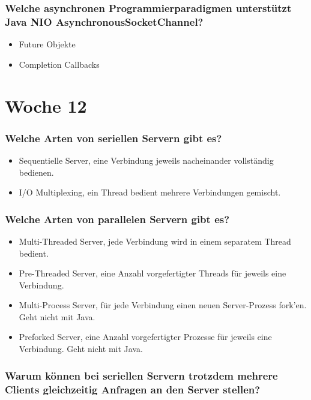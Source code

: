 \documentclass[10pt,a4paper]{scrartcl}
\begin{document}
\subsubsection{Welche asynchronen Programmierparadigmen unterstützt Java NIO AsynchronousSocketChannel?}

\begin{itemize}
	\item Future Objekte
	\item Completion Callbacks
\end{itemize}


\section{Woche 12}

\subsubsection{Welche Arten von seriellen Servern gibt es?}

\begin{itemize}
	\item Sequentielle Server, eine Verbindung jeweils nacheinander vollständig bedienen.
	\item I/O Multiplexing, ein Thread bedient mehrere Verbindungen gemischt.
\end{itemize}

\subsubsection{Welche Arten von parallelen Servern gibt es?}

\begin{itemize}
	\item Multi-Threaded Server, jede Verbindung wird in einem separatem Thread bedient.
	\item Pre-Threaded Server, eine Anzahl vorgefertigter Threads für jeweils eine Verbindung.
	\item Multi-Process Server, für jede Verbindung einen neuen Server-Prozess fork'en. Geht nicht mit
		Java.
	\item Preforked Server, eine Anzahl vorgefertigter Prozesse für jeweils eine Verbindung. Geht
		nicht mit Java.
\end{itemize}

\subsubsection{Warum können bei seriellen Servern trotzdem mehrere Clients gleichzeitig Anfragen
an den Server stellen?}
\end{document}

